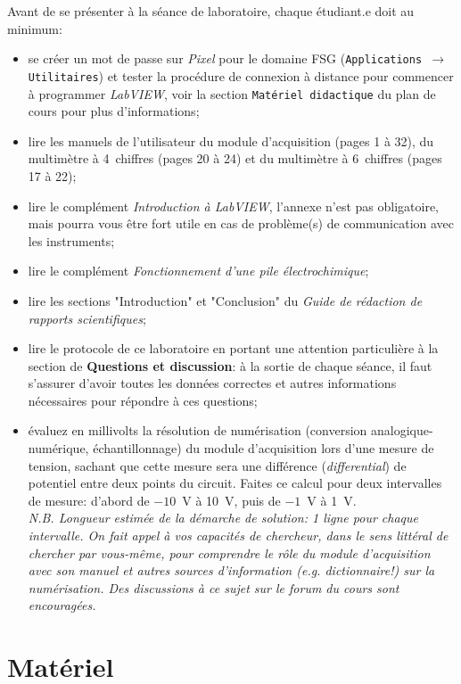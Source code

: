 \documentclass[canadien,12pt,oneside,letterpaper]{article}
\begin{document}
\noindent Avant de se présenter à la séance de laboratoire, chaque étudiant.e doit au minimum:
\vspace{1ex}
\begin{itemize} \itemsep5pt
\item se créer un mot de passe sur \textit{Pixel} pour le domaine FSG (\texttt{Applications $\rightarrow$ Utilitaires}) et tester la procédure de connexion à distance pour commencer à programmer \textit{LabVIEW}, voir la section \texttt{Matériel didactique} du plan de cours pour plus d'informations;
\item lire les manuels de l'utilisateur du module d'acquisition (pages 1 à 32), du multimètre à 4\textonehalf~chiffres (pages 20 à 24) et du multimètre à 6\textonehalf~chiffres (pages 17 à 22);
\item lire le complément \textit{Introduction à LabVIEW}, l'annexe n'est pas obligatoire, mais pourra vous être fort utile en cas de problème(s) de communication avec les instruments;
\item lire le complément \textit{Fonctionnement d'une pile électrochimique};
\item lire les sections "Introduction" et "Conclusion" du \textit{Guide de rédaction de rapports scientifiques};
\item lire le protocole de ce laboratoire en portant une attention particulière à la section de \textbf{Questions et discussion}: à la sortie de chaque séance, il faut s'assurer d'avoir toutes les données correctes et autres informations nécessaires pour répondre à ces questions;
\item évaluez en millivolts la résolution de numérisation (conversion analogique-numérique, échantillonnage) du module d'acquisition lors d'une mesure de tension, sachant que cette mesure sera une différence (\textit{differential}) de potentiel entre deux points du circuit. Faites ce calcul pour deux intervalles de mesure: d'abord de $-10$~V à 10~V, puis de $-1$~V à 1~V.\\ \textit{N.B. Longueur estimée de la démarche de solution: 1 ligne pour chaque intervalle. On fait appel à vos capacités de chercheur, dans le sens littéral de chercher par vous-même, pour comprendre le rôle du module d'acquisition avec son manuel et autres sources d'information (\textit{e.g.} dictionnaire!) sur la numérisation. Des discussions à ce sujet sur le forum du cours sont encouragées.}
\end{itemize}


\section{Matériel}
\end{document}
